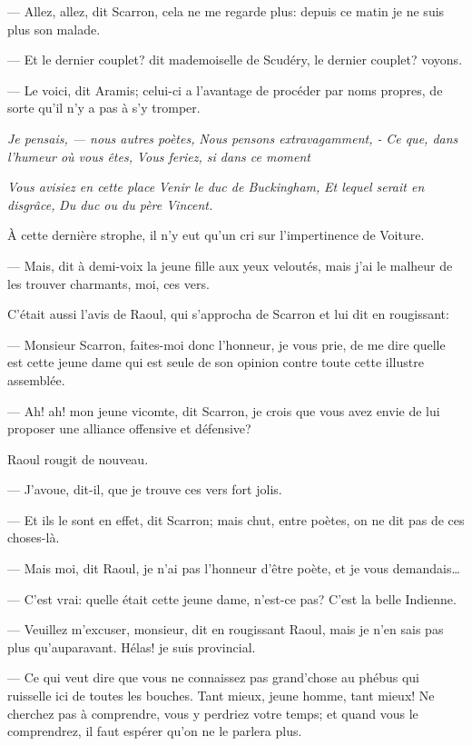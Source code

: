 — Allez, allez, dit Scarron, cela ne me regarde plus: depuis ce matin je ne suis plus son malade.

— Et le dernier couplet? dit mademoiselle de Scudéry, le dernier couplet? voyons.

— Le voici, dit Aramis; celui-ci a l'avantage de procéder par noms propres, de sorte qu'il n'y a pas à s'y tromper.

\textit{Je pensais, — nous autres poètes,} \textit{Nous pensons extravagamment, -} \textit{Ce que, dans l'humeur où vous êtes,} \textit{Vous feriez, si dans ce moment}

\textit{Vous avisiez en cette place} \textit{Venir le duc de Buckingham,} \textit{Et lequel serait en disgrâce,} \textit{Du duc ou du père Vincent.}

À cette dernière strophe, il n'y eut qu'un cri sur l'impertinence de Voiture.

— Mais, dit à demi-voix la jeune fille aux yeux veloutés, mais j'ai le malheur de les trouver charmants, moi, ces vers.

C'était aussi l'avis de Raoul, qui s'approcha de Scarron et lui dit en rougissant:

— Monsieur Scarron, faites-moi donc l'honneur, je vous prie, de me dire quelle est cette jeune dame qui est seule de son opinion contre toute cette illustre assemblée.

— Ah! ah! mon jeune vicomte, dit Scarron, je crois que vous avez envie de lui proposer une alliance offensive et défensive?

Raoul rougit de nouveau.

— J'avoue, dit-il, que je trouve ces vers fort jolis.

— Et ils le sont en effet, dit Scarron; mais chut, entre poètes, on ne dit pas de ces choses-là.

— Mais moi, dit Raoul, je n'ai pas l'honneur d'être poète, et je vous demandais\dots

— C'est vrai: quelle était cette jeune dame, n'est-ce pas? C'est la belle Indienne.

— Veuillez m'excuser, monsieur, dit en rougissant Raoul, mais je n'en sais pas plus qu'auparavant. Hélas! je suis provincial.

— Ce qui veut dire que vous ne connaissez pas grand'chose au phébus qui ruisselle ici de toutes les bouches. Tant mieux, jeune homme, tant mieux! Ne cherchez pas à comprendre, vous y perdriez votre temps; et quand vous le comprendrez, il faut espérer qu'on ne le parlera plus.

